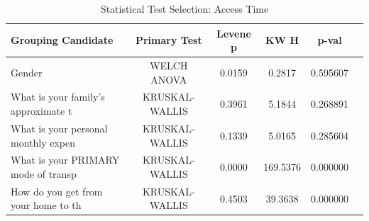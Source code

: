 \begin{table}[htbp]
\centering
\caption{Statistical Test Selection: Access Time}
\label{tab:analysis_02_access_time}
\begin{tabular}{lccccc}
\hline
\textbf{Grouping Candidate} & \textbf{Primary Test} & \textbf{Levene p} & \textbf{KW H} & \textbf{p-val} \\
\hline
Gender & WELCH ANOVA & 0.0159 & 0.2817 & 0.595607 \\
What is your family's approximate t & KRUSKAL-WALLIS & 0.3961 & 5.1844 & 0.268891 \\
What is your personal monthly expen & KRUSKAL-WALLIS & 0.1339 & 5.0165 & 0.285604 \\
What is your PRIMARY mode of transp & KRUSKAL-WALLIS & 0.0000 & 169.5376 & 0.000000 \\
How do you get from your home to th & KRUSKAL-WALLIS & 0.4503 & 39.3638 & 0.000000 \\
\hline
\end{tabular}
\end{table}
